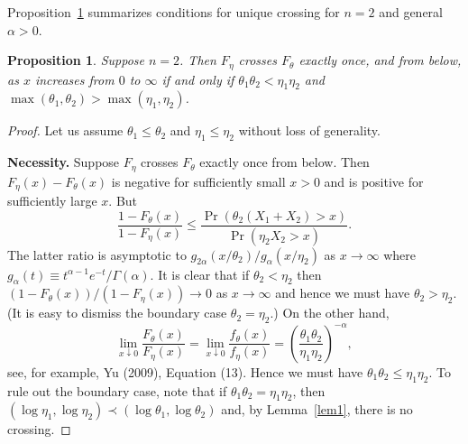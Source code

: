 \documentclass[11pt]{article}
\newtheorem{proposition}{\bf Proposition}
\begin{document}
Proposition~\ref{prop1} summarizes conditions for unique crossing for $n=2$ and general $\alpha>0$.
\begin{proposition}
\label{prop1}
Suppose $n=2$.  Then $F_\eta$ crosses $F_\theta$ exactly once, and from below, as $x$ increases from $0$ to $\infty$ if and only if $\theta_1 \theta_2 < \eta_1 \eta_2$ and $\max(\theta_1, \theta_2) > \max(\eta_1, \eta_2)$.
\end{proposition}
\begin{proof}
Let us assume $\theta_1 \leq \theta_2$ and $\eta_1 \leq \eta_2$ without loss of generality. 

{\bf Necessity.} Suppose $F_\eta$ crosses $F_\theta$ exactly once from below.  Then $F_\eta(x) -F_\theta(x)$ is negative for sufficiently small $x>0$ and is positive for sufficiently large $x$.  But 
$$\frac{1 - F_\theta(x)}{1 - F_\eta(x)}  \leq \frac{\Pr(\theta_2 (X_1+X_2) > x)}{\Pr(\eta_2 X_2 > x)}.$$
The latter ratio is asymptotic to $g_{2\alpha}(x/\theta_2)/ g_\alpha(x/\eta_2)$ as $x\to \infty$ where $g_\alpha(t) \equiv  t^{\alpha -1} e^{-t} /\Gamma(\alpha)$.  It is clear that if $\theta_2 < \eta_2$ then $(1 - F_\theta(x))/(1 - F_\eta(x))\to 0$ as $x\to\infty$ and hence we must have $\theta_2> \eta_2$.  (It is easy to dismiss the boundary case $\theta_2 = \eta_2$.)  On the other hand,  
$$\lim_{x\downarrow 0} \frac{F_\theta(x)}{F_\eta(x)} = \lim_{x\downarrow 0} \frac{ f_\theta(x)
}{f_\eta(x)} = \left(\frac{\theta_1\theta_2}{\eta_1\eta_2}\right)^{-\alpha},$$
see, for example, Yu (2009), Equation (13).  Hence we must have $\theta_1\theta_2 \leq \eta_1\eta_2$.  To rule out the boundary case, note that if $\theta_1\theta_2 = \eta_1\eta_2$, then $(\log\eta_1, \log\eta_2)\prec (\log \theta_1, \log \theta_2)$ and, by Lemma~\ref{lem1}, there is no crossing.


\end{proof}
\end{document}
